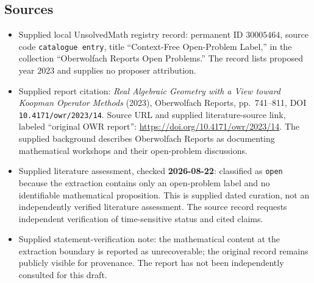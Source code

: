 \documentclass[11pt]{article}
\begin{document}
\subsection{Sources}
\begin{itemize}
\item Supplied local UnsolvedMath registry record: permanent ID \(30005464\), source code \texttt{catalogue entry}, title ``Context-Free Open-Problem Label,'' in the collection ``Oberwolfach Reports Open Problems.'' The record lists proposed year \(2023\) and supplies no proposer attribution.
\item Supplied report citation: \emph{Real Algebraic Geometry with a View toward Koopman Operator Methods} (2023), Oberwolfach Reports, pp.~741--811, DOI \texttt{10.4171/owr/2023/14}. Source URL and supplied literature-source link, labeled ``original OWR report'': \url{https://doi.org/10.4171/owr/2023/14}. The supplied background describes Oberwolfach Reports as documenting mathematical workshops and their open-problem discussions.
\item Supplied literature assessment, checked \textbf{2026-08-22}: classified as \texttt{open} because the extraction contains only an open-problem label and no identifiable mathematical proposition. This is supplied dated curation, not an independently verified literature assessment. The source record requests independent verification of time-sensitive status and cited claims.
\item Supplied statement-verification note: the mathematical content at the extraction boundary is reported as unrecoverable; the original record remains publicly visible for provenance. The report has not been independently consulted for this draft.
\end{itemize}
\end{document}
